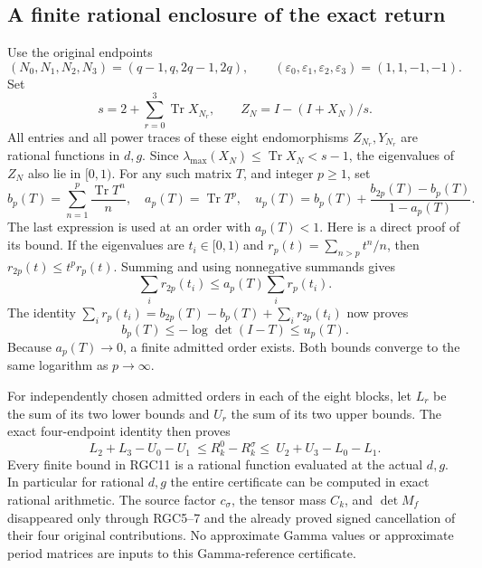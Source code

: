 \subsection{A finite rational enclosure of the exact return}
Use the original endpoints
\[
 (N_0,N_1,N_2,N_3)=(q-1,q,2q-1,2q),\qquad
 (\varepsilon_0,\varepsilon_1,\varepsilon_2,\varepsilon_3)=(1,1,-1,-1).
\]
Set
\[
 s=2+\sum_{r=0}^3\operatorname{Tr}X_{N_r},\qquad
 Z_N=I-(I+X_N)/s.\tag{RGC8}
\]
All entries and all power traces of these eight endomorphisms
$Z_{N_r},Y_{N_r}$ are rational functions in $d,g$.
Since $\lambda_{\max}(X_N)\le\operatorname{Tr}X_N<s-1$,
the eigenvalues of $Z_N$ also lie in $[0,1)$.
For any such matrix $T$, and integer $p\ge1$, set
\[
 b_p(T)=\sum_{n=1}^p\frac{\operatorname{Tr}T^n}{n},\quad
 a_p(T)=\operatorname{Tr}T^p,\quad
 u_p(T)=b_p(T)+\frac{b_{2p}(T)-b_p(T)}{1-a_p(T)}.\tag{RGC9}
\]
The last expression is used at an order with $a_p(T)<1$.
Here is a direct proof of its bound. If the eigenvalues are
$t_i\in[0,1)$ and $r_p(t)=\sum_{n>p}t^n/n$, then
$r_{2p}(t)\le t^p r_p(t)$. Summing and using nonnegative
summands gives
\[
 \sum_i r_{2p}(t_i)\le a_p(T)\sum_i r_p(t_i).
\]
The identity
$\sum_i r_p(t_i)=b_{2p}(T)-b_p(T)+\sum_i r_{2p}(t_i)$
now proves
\[
 b_p(T)\le-\log\det(I-T)\le u_p(T).\tag{RGC10}
\]
Because $a_p(T)\to0$, a finite admitted order exists. Both
bounds converge to the same logarithm as $p\to\infty$.

For independently chosen admitted orders in each of the eight
blocks, let $L_r$ be the sum of its two lower bounds and $U_r$
the sum of its two upper bounds. The exact four-endpoint identity
then proves
\[
 L_2+L_3-U_0-U_1
 \ \le R_k^0-R_k^\sigma\le\
 U_2+U_3-L_0-L_1.\tag{RGC11}
\]
Every finite bound in RGC11 is a rational function evaluated at
the actual $d,g$. In particular for rational $d,g$ the entire
certificate can be computed in exact rational arithmetic.
The source factor $c_\sigma$, the tensor mass $C_k$, and
$\det M_f$ disappeared only through RGC5--7 and the already
proved signed cancellation of their four original contributions.
No approximate Gamma values or approximate period matrices are
inputs to this Gamma-reference certificate.

